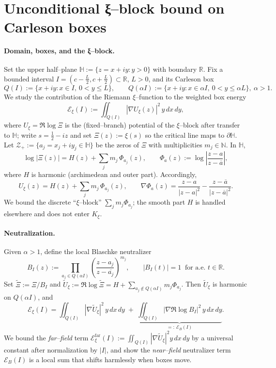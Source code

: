 
\section*{Unconditional ξ–block bound on Carleson boxes}

\paragraph{Domain, boxes, and the ξ–block.}
Set the upper half–plane $\mathbb{H}:=\{z=x+iy:y>0\}$ with boundary $\mathbb{R}$. Fix a bounded interval $I=(c-\tfrac{L}{2},c+\tfrac{L}{2})\subset\mathbb{R}$, $L>0$, and its Carleson box
\[
Q(I):=\{x+iy: x\in I,\ 0<y\le L\},\qquad Q(\alpha I):=\{x+iy: x\in \alpha I,\ 0<y\le \alpha L\},\ \alpha>1.
\]
We study the contribution of the Riemann $\xi$–function to the weighted box energy
\[
\mathcal{E}_{\xi}(I):=\iint_{Q(I)} |\nabla U_{\xi}(z)|^2\,y\,dx\,dy,
\]
where $U_{\xi}=\Re\log \Xi$ is the (fixed–branch) potential of the $\xi$–block after transfer to $\mathbb{H}$; write $s=\tfrac{1}{2}-i z$ and set $\Xi(z):=\xi(s)$ so the critical line maps to $\partial\mathbb{H}$. Let $\mathcal{Z}_+:=\{a_j=x_j+i y_j\in\mathbb{H}\}$ be the zeros of $\Xi$ with multiplicities $m_j\in\mathbb{N}$. In $\mathbb{H}$,
\[
\log |\Xi(z)| = H(z) + \sum_{j} m_j\,\Phi_{a_j}(z),\qquad
\Phi_{a}(z):=\log\left|\frac{z-a}{z-\overline{a}}\right|,
\]
where $H$ is harmonic (archimedean and outer part). Accordingly,
\[
U_{\xi}(z)=H(z)+\sum_j m_j \,\Phi_{a_j}(z),\qquad 
\nabla\Phi_{a}(z)=\frac{z-a}{|z-a|^2}-\frac{z-\overline{a}}{|z-\overline{a}|^2}.
\]
We bound the discrete “$\xi$–block” $\sum_j m_j\Phi_{a_j}$; the smooth part $H$ is handled elsewhere and does not enter $K_{\xi}$.

\paragraph{Neutralization.}
Given $\alpha>1$, define the local Blaschke neutralizer
\[
B_I(z):=\prod_{a_j\in Q(\alpha I)}\left(\frac{z-a_j}{z-\overline{a_j}}\right)^{m_j},\qquad |B_I(t)|=1\ \text{ for a.e. } t\in\mathbb{R}.
\]
Set $\widetilde{\Xi}:=\Xi/B_I$ and $\widetilde{U}_{\xi}:=\Re\log \widetilde{\Xi} = H+\sum_{a_j\notin Q(\alpha I)} m_j \Phi_{a_j}$. Then $\widetilde{U}_\xi$ is harmonic on $Q(\alpha I)$, and
\[
\mathcal{E}_{\xi}(I)=\iint_{Q(I)} |\nabla \widetilde{U}_{\xi}|^2\,y\,dx\,dy\;+\;\underbrace{\iint_{Q(I)} |\nabla \Re\log B_I|^2\,y\,dx\,dy}_{=:\ \mathcal{E}_{B}(I)}.
\]
We bound the \emph{far–field} term $\mathcal{E}^{\mathrm{far}}_{\xi}(I):=\iint_{Q(I)} |\nabla \widetilde{U}_{\xi}|^2 y\,dx\,dy$ by a universal constant after normalization by $|I|$, and show the \emph{near–field} neutralizer term $\mathcal{E}_B(I)$ is a local sum that shifts harmlessly when boxes move.

